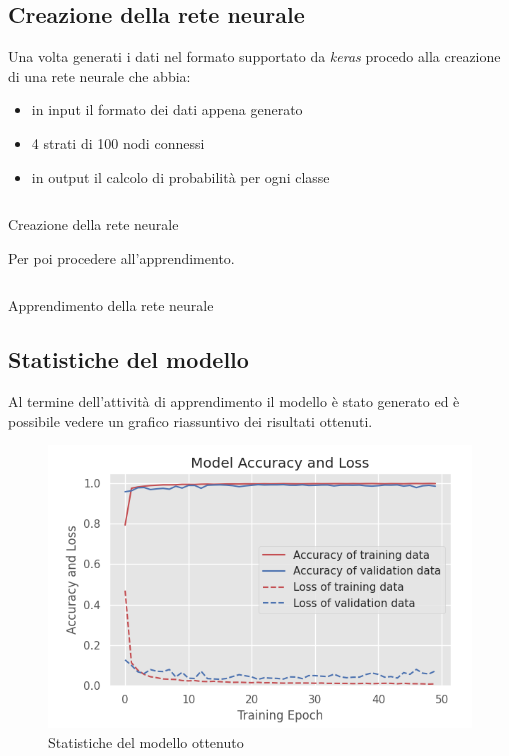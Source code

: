 \subsection{Creazione della rete neurale}
Una volta generati i dati nel formato supportato da \textit{keras} procedo alla creazione di 
una rete neurale che abbia:
\begin{itemize}
    \item in input il formato dei dati appena generato
    \item 4 strati di 100 nodi connessi
    \item in output il calcolo di probabilità per ogni classe
\end{itemize}
\begin{listing}[H] 
    \inputminted[frame=single,framesep=10pt]{python}{assets/snippets/classifier/dnn_create.py}
    \caption{Creazione della rete neurale}
\end{listing}
Per poi procedere all'apprendimento.
\begin{listing}[H] 
    \inputminted[frame=single,framesep=10pt]{python}{assets/snippets/classifier/dnn_fit.py}
    \caption{Apprendimento della rete neurale}
\end{listing}


\newpage
\subsection{Statistiche del modello}
Al termine dell'attività di apprendimento il modello è stato generato ed è possibile vedere un grafico 
riassuntivo dei risultati ottenuti.
\begin{figure}[H]
    \centering
    \includegraphics[scale = 0.80]{assets/images/classifications/accelerometer/right_hand/model-right-hand-acc.png}
    \caption{Statistiche del modello ottenuto}
\end{figure}


